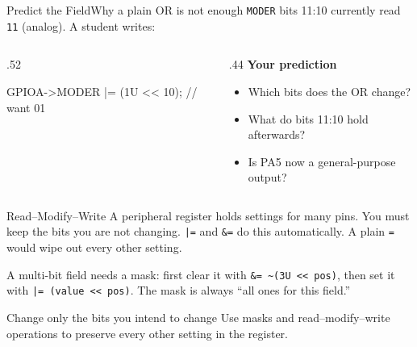 \documentclass[9pt,aspectratio=169,xcolor=table]{beamer}
\newcommand{\shl}{\texttt{<{}<}}
\begin{document}
{\beamerextras
\begin{frame}[fragile]{Predict the Field}{Why a plain OR is not enough}
    \leavevmode
    \texttt{MODER} bits 11:10 currently read \texttt{11} (analog). A student writes:

    \vspace{2mm}
    \begin{columns}[T]
    \begin{column}{.52\textwidth}
\begin{cc}[basicstyle=\ttfamily\small]
GPIOA->MODER |= (1U << 10);   // want 01
\end{cc}
    \end{column}
    \begin{column}{.44\textwidth}
        \textbf{Your prediction}
        {\small
        \begin{itemize}\itemsep2pt
            \item Which bits does the OR change?
            \item What do bits 11:10 hold afterwards?
            \item Is PA5 now a general-purpose output?
        \end{itemize}}
    \end{column}
    \end{columns}

    \vspace{2mm}
\end{frame}
}

\begin{frame}{Read--Modify--Write}
    \leavevmode
    A peripheral register holds settings for \alert{many} pins. You
    must keep the bits you are not changing. \texttt{|=} and
    \texttt{\&=} do this automatically. A plain \texttt{=} would wipe
    out every other setting.

    \vspace{3mm}
    {\small A multi-bit field needs a \alert{mask}: first clear it
    with \texttt{\&= \textasciitilde(3U \shl\ pos)}, then set it with
    \texttt{|= (value \shl\ pos)}. The mask is always ``all ones for this
    field.''}

    \vspace{3mm}
    \begin{block}{Change only the bits you intend to change}
        Use masks and read--modify--write operations to preserve
        every other setting in the register.
    \end{block}
\end{frame}
\end{document}
